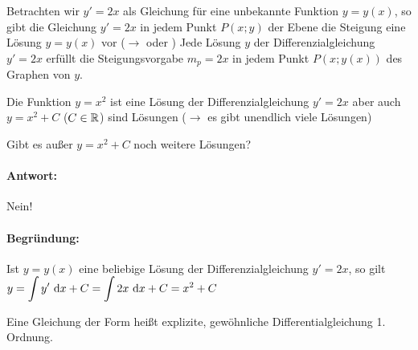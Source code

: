
Betrachten wir $y'=2x$ als Gleichung für eine unbekannte Funktion $y=y(x)$, so gibt die Gleichung $y'=2x$ in jedem Punkt $P(x;y)$ der Ebene die Steigung eine Lösung $y=y(x)$ vor ($\rightarrow$  oder )
\imgplaceholder
Jede Lösung $y$ der Differenzialgleichung $y'=2x$ erfüllt die Steigungsvorgabe $m_p=2x$ in jedem Punkt $P(x;y(x))$ des Graphen von $y$.

Die Funktion $y=x^2$ ist eine Lösung der Differenzialgleichung $y'=2x$ aber auch $y=x^2+C$ ($C\in\mathbb{R}$) sind Lösungen ($\rightarrow$ es gibt unendlich viele Lösungen)

\Frage Gibt es außer $y=x^2+C$ noch weitere Lösungen?

\paragraph{Antwort:} Nein!

\paragraph{Begründung:} Ist $y=y(x)$ eine beliebige Lösung der Differenzialgleichung $y'=2x$, so gilt $y=\displaystyle\int y'\ \mathrm{d}x+C=\displaystyle\int2x\ \mathrm{d}x+C=x^2+C$

\Def Eine Gleichung der Form
heißt explizite, gewöhnliche Differentialgleichung 1. Ordnung.


